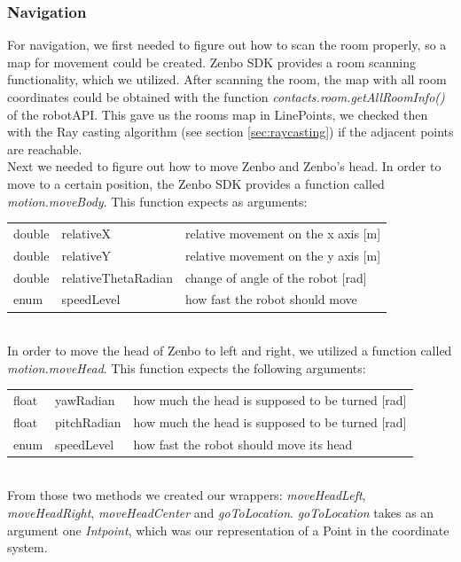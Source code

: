 \documentclass[conference]{IEEEtran}
\begin{document}
\subsubsection{Navigation}
For navigation, we first needed to figure out how to scan the room properly, so 
a map for movement could be created. Zenbo SDK provides a room scanning functionality, which we utilized.
After scanning the room, the map with all room coordinates could be obtained with the 
function \textit{contacts.room.getAllRoomInfo()} of the robotAPI.
This gave us the rooms map in LinePoints, we checked then with the Ray casting algorithm (see section \ref{sec:raycasting}) if the adjacent points are reachable.\\ 
Next we needed to figure out how to move Zenbo and Zenbo's head. In order to move to a certain position, the Zenbo SDK provides a function called \textit{motion.moveBody}.
This function expects as arguments:
\begin{table}[h]
	\begin{tabular}{lll}
		double & relativeX           & relative movement on the x axis [m] \\
		double & relativeY           & relative movement on the y axis [m] \\
		double & relativeThetaRadian & change of angle of the robot [rad]  \\
		enum   & speedLevel          & how fast the robot should move      
	\end{tabular}
\end{table}\\
In order to move the head of Zenbo to left and right, we utilized a function called \textit{motion.moveHead}.
This function expects the following arguments: 
\begin{table}[h]
	\begin{tabular}{lll}
		float & yawRadian   & how much the head is supposed to be turned [rad] \\
		float & pitchRadian & how much the head is supposed to be turned [rad] \\
		enum  & speedLevel  & how fast the robot should move  its head         
	\end{tabular}
\end{table}\\
From those two methods we created our wrappers: \textit{moveHeadLeft}, \textit{moveHeadRight}, \textit{moveHeadCenter} 
and \textit{goToLocation}.
\textit{goToLocation} takes as an argument one \textit{Intpoint}, which was our representation of a Point in the coordinate system.
\end{document}

